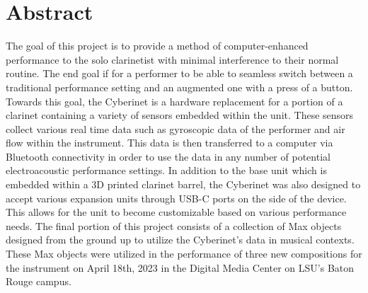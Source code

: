 \tableofcontents









\chapter{Abstract}


The goal of this project is to provide a method of computer-enhanced performance to the solo clarinetist with minimal interference to their normal routine. The end goal if for a performer to be able to seamless switch between a traditional performance setting and an augmented one with a press of a button. Towards this goal, the Cyberinet is a hardware replacement for a portion of a clarinet containing a variety of sensors embedded within the unit. These sensors collect various real time data such as gyroscopic data of the performer and air flow within the instrument. This data is then transferred to a computer via Bluetooth connectivity in order to use the data in any number of potential electroacoustic performance settings. In addition to the base unit which is embedded within a 3D printed clarinet barrel, the Cyberinet was also designed to accept various expansion units through USB-C ports on the side of the device. This allows for the unit to become customizable based on various performance needs. The final portion of this project consists of a collection of Max objects designed from the ground up to utilize the Cyberinet’s data in musical contexts. These Max objects were utilized in the performance of three new compositions for the instrument on April 18th, 2023 in the Digital Media Center on LSU’s Baton Rouge campus.

\mainmatter



